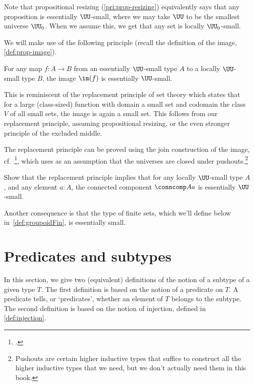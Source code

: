 \begin{remark}
  Note that propositional resizing (\cref{pri:prop-resizing})
  equivalently says that any proposition is essentially $\UU$-small,
  where we may take $\UU$ to be the smallest universe $\UU_0$.
  When we assume this, we get that any set is locally $\UU_0$-small.
\end{remark}

We will make use of the following principle
(recall the definition of the image, \cref{def:prop-image}).
\begin{principle}[Replacement]
  \label{pri:replacement}
  For any map $f : A \to B$
  from an essentially $\UU$-small type $A$
  to a locally $\UU$-small type $B$,
  the image $\im(f)$ is essentially $\UU$-small.
\end{principle}
This is reminiscent of the replacement principle of set theory which states
that for a large (class-sized) function with domain a small set
and codomain the class $V$ of all small sets,
the image is again a small set.
This follows from our replacement principle,
assuming propositional resizing,
or the even stronger principle of the excluded middle.

The replacement principle can be proved using the join construction of the image, cf.~\citeauthor{Rijke-Join}\footcite{Rijke-Join},
which uses as an assumption that the universes
are closed under pushouts.\footnote{%
  Pushouts are certain higher inductive types that suffice
  to construct all the higher inductive types that we need,
  but we don't actually need them in this book.}
\begin{xca}\label{xca:comp-loc-small-ess-small}
  Show that the replacement principle implies that for any locally $\UU$-small type $A$,
  and any element $a:A$,
  the connected component $\conncomp A a$ is essentially $\UU$-small.
\end{xca}
Another consequence is that the type of finite sets, which we'll define below
in~\cref{def:groupoidFin}, is essentially small.


\section{Predicates and subtypes}
\label{sec:subtype}

In this section, we give two (equivalent) definitions of the notion
of a subtype of a given type $T$. The first definition is based
on the notion of a predicate on $T$. A predicate tells, or `predicates',
whether an element of $T$ belongs to the subtype. The second definition
is based on the notion of injection, defined in \cref{def:injection}.

